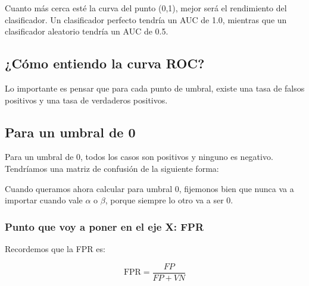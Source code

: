 \documentclass[12pt]{article}
\begin{document}
Cuanto más cerca esté la curva del punto (0,1), mejor será el rendimiento del clasificador. Un clasificador perfecto tendría un AUC de 1.0, mientras que un clasificador aleatorio tendría un AUC de 0.5.

\subsection{¿Cómo entiendo la curva ROC?}

Lo importante es pensar que para cada punto de umbral, existe una tasa de falsos positivos y una tasa de verdaderos positivos.

\subsection{Para un umbral de 0}

Para un umbral de 0, todos los casos son positivos y ninguno es negativo. Tendríamos una matriz de confusión de la siguiente forma:

\begin{center}
\end{center}

Cuando queramos ahora calcular para umbral 0, fijemonos bien que nunca va a importar cuando vale $\alpha$ o $\beta$, porque siempre lo otro va a ser 0.

\subsubsection{Punto que voy a poner en el eje X: FPR}

Recordemos que la FPR es:

\[
\text{FPR} = \frac{FP}{FP + VN}
\]

\vspace{0.3em}
\end{document}
